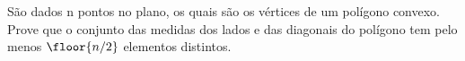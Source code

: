 São dados n pontos no plano, os quais são os vértices de um polígono convexo.
Prove que o conjunto das medidas dos lados e das diagonais do polígono tem pelo menos $\floor{n / 2}$ elementos distintos.
